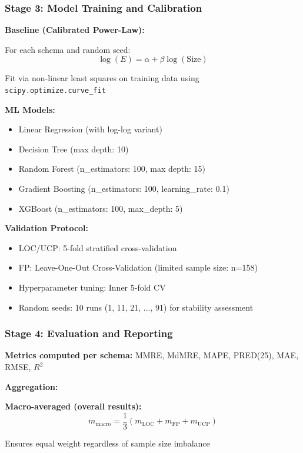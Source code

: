 \documentclass[11pt,a4paper]{article}
\begin{document}
\subsubsection{Stage 3: Model Training and Calibration}

\textbf{Baseline (Calibrated Power-Law):}

For each schema and random seed:
$$\log(E) = \alpha + \beta \log(\text{Size})$$

Fit via non-linear least squares on training data using \texttt{scipy.optimize.curve\_fit}

\textbf{ML Models:}

\begin{itemize}
    \item Linear Regression (with log-log variant)
    \item Decision Tree (max depth: 10)
    \item Random Forest (n\_estimators: 100, max depth: 15)
    \item Gradient Boosting (n\_estimators: 100, learning\_rate: 0.1)
    \item XGBoost (n\_estimators: 100, max\_depth: 5)
\end{itemize}

\textbf{Validation Protocol:}

\begin{itemize}
    \item LOC/UCP: 5-fold stratified cross-validation
    \item FP: Leave-One-Out Cross-Validation (limited sample size: n=158)
    \item Hyperparameter tuning: Inner 5-fold CV
    \item Random seeds: 10 runs (1, 11, 21, ..., 91) for stability assessment
\end{itemize}

\subsubsection{Stage 4: Evaluation and Reporting}

\textbf{Metrics computed per schema:} MMRE, MdMRE, MAPE, PRED(25), MAE, RMSE, $R^2$

\textbf{Aggregation:}

\textbf{Macro-averaged (overall results):}
$$m_{\text{macro}} = \frac{1}{3}(m_{\text{LOC}} + m_{\text{FP}} + m_{\text{UCP}})$$

Ensures equal weight regardless of sample size imbalance
\end{document}
